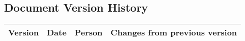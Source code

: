 \subsection*{Document Version History}

\begin{table}[h]
  \centering
  \begin{tabularx}{\textwidth}{|c|c|c|X|}
    \hline
    \rowcolor{iob-green}
             {\bf Version} & {\bf Date} & {\bf Person} & {\bf Changes from previous version} \\ \hline
             
  \end{tabularx}
\end{table}
